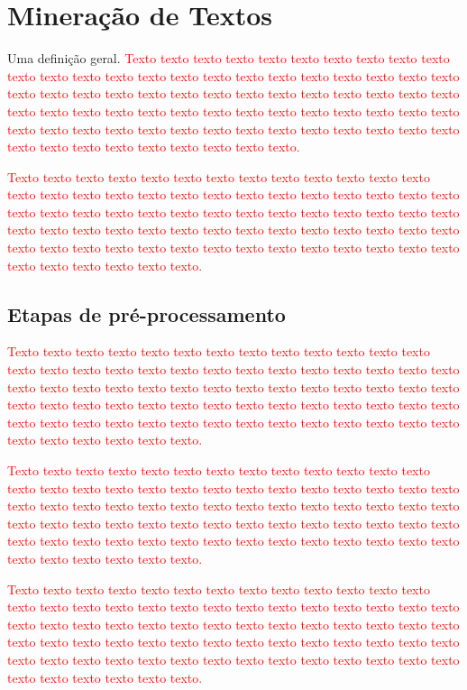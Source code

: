 \documentclass[normaltoc, espacoumemeio, pnumromarab,ruledheader]{abnt}
\begin{document}
\section{Mineração de Textos}

Uma definição geral. \textcolor{red}{Texto texto texto texto texto texto texto texto texto texto texto texto texto texto texto texto texto texto texto texto texto texto texto texto texto texto texto texto texto texto texto texto texto texto texto texto texto texto texto texto texto texto texto texto texto texto texto texto texto texto texto texto texto texto texto texto texto texto texto texto texto texto texto texto texto texto texto texto texto texto texto texto texto texto texto.}

\textcolor{red}{Texto texto texto texto texto texto texto texto texto texto texto texto texto texto texto texto texto texto texto texto texto texto texto texto texto texto texto texto texto texto texto texto texto texto texto texto texto texto texto texto texto texto texto texto texto texto texto texto texto texto texto texto texto texto texto texto texto texto texto texto texto texto texto texto texto texto texto texto texto texto texto texto texto texto texto.}

	 \subsection{Etapas de pré-processamento}
	
	\textcolor{red}{Texto texto texto texto texto texto texto texto texto texto texto texto texto texto texto texto texto texto texto texto texto texto texto texto texto texto texto texto texto texto texto texto texto texto texto texto texto texto texto texto texto texto texto texto texto texto texto texto texto texto texto texto texto texto texto texto texto texto texto texto texto texto texto texto texto texto texto texto texto texto texto texto texto texto texto.}
	
	\textcolor{red}{Texto texto texto texto texto texto texto texto texto texto texto texto texto texto texto texto texto texto texto texto texto texto texto texto texto texto texto texto texto texto texto texto texto texto texto texto texto texto texto texto texto texto texto texto texto texto texto texto texto texto texto texto texto texto texto texto texto texto texto texto texto texto texto texto texto texto texto texto texto texto texto texto texto texto texto.}
	
	\textcolor{red}{Texto texto texto texto texto texto texto texto texto texto texto texto texto texto texto texto texto texto texto texto texto texto texto texto texto texto texto texto texto texto texto texto texto texto texto texto texto texto texto texto texto texto texto texto texto texto texto texto texto texto texto texto texto texto texto texto texto texto texto texto texto texto texto texto texto texto texto texto texto texto texto texto texto texto texto.}
	
\end{document}

